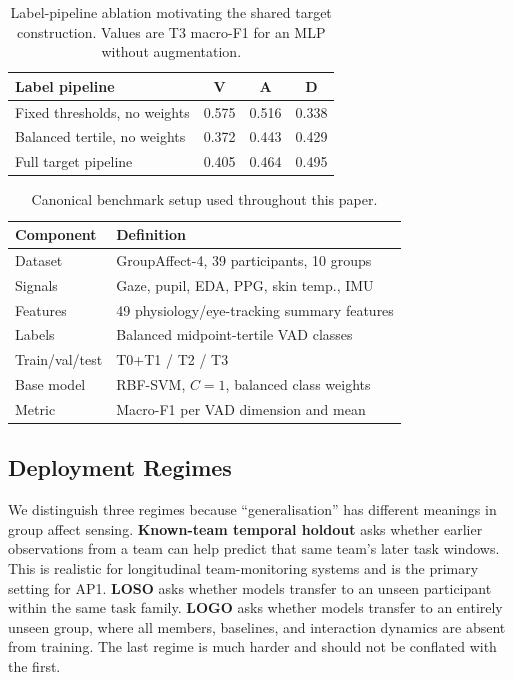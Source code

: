\documentclass[sigconf,review,anonymous]{acmart}
\begin{document}
\begin{table}[t]
\caption{Label-pipeline ablation motivating the shared target construction.
Values are T3 macro-F1 for an MLP without augmentation.}
\label{tab:target_ablation}
\centering
\setlength{\tabcolsep}{4pt}
\small
\begin{tabular}{lccc}
\toprule
\textbf{Label pipeline} & \textbf{V} & \textbf{A} & \textbf{D} \\
\midrule
Fixed thresholds, no weights & 0.575 & 0.516 & 0.338 \\
Balanced tertile, no weights & 0.372 & 0.443 & 0.429 \\
Full target pipeline         & 0.405 & 0.464 & 0.495 \\
\bottomrule
\end{tabular}
\end{table}

\begin{table}[t]
\caption{Canonical benchmark setup used throughout this paper.}
\label{tab:setup}
\centering
\setlength{\tabcolsep}{4pt}
\small
\begin{tabular}{ll}
\toprule
\textbf{Component} & \textbf{Definition} \\
\midrule
Dataset & GroupAffect-4, 39 participants, 10 groups \\
Signals & Gaze, pupil, EDA, PPG, skin temp., IMU \\
Features & 49 physiology/eye-tracking summary features \\
Labels & Balanced midpoint-tertile VAD classes \\
Train/val/test & T0+T1 / T2 / T3 \\
Base model & RBF-SVM, $C=1$, balanced class weights \\
Metric & Macro-F1 per VAD dimension and mean \\
\bottomrule
\end{tabular}
\end{table}

\subsection{Deployment Regimes}
\label{sec:deployment}

We distinguish three regimes because ``generalisation'' has different meanings
in group affect sensing.
\textbf{Known-team temporal holdout} asks whether earlier observations from a
team can help predict that same team's later task windows.
This is realistic for longitudinal team-monitoring systems and is the primary
setting for AP1.
\textbf{LOSO} asks whether models transfer to an unseen participant within the
same task family.
\textbf{LOGO} asks whether models transfer to an entirely unseen group, where
all members, baselines, and interaction dynamics are absent from training.
The last regime is much harder and should not be conflated with the first.
\end{document}
